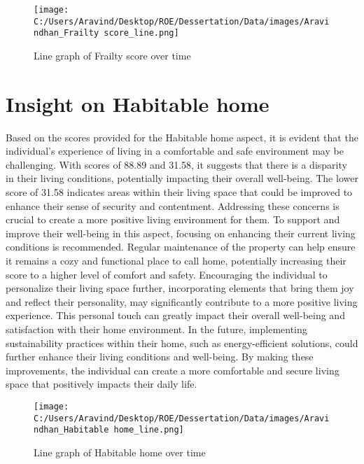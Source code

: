 \documentclass[10pt, a4paper]{article}%
\begin{document}
\begin{figure}[H]%
\centering%
\texttt{[image: C:/Users/Aravind/Desktop/ROE/Dessertation/Data/images/Aravindhan\_Frailty score\_line.png]}%
\caption{Line graph of Frailty score over time}%
\end{figure}

%
\section{Insight on Habitable home}%
\label{sec:InsightonHabitablehome}%
Based on the scores provided for the Habitable home aspect, it is evident that the individual's experience of living in a comfortable and safe environment may be challenging. With scores of 88.89 and 31.58, it suggests that there is a disparity in their living conditions, potentially impacting their overall well{-}being.\newline%
\newline%
The lower score of 31.58 indicates areas within their living space that could be improved to enhance their sense of security and contentment. Addressing these concerns is crucial to create a more positive living environment for them.\newline%
\newline%
To support and improve their well{-}being in this aspect, focusing on enhancing their current living conditions is recommended. Regular maintenance of the property can help ensure it remains a cozy and functional place to call home, potentially increasing their score to a higher level of comfort and safety.\newline%
\newline%
Encouraging the individual to personalize their living space further, incorporating elements that bring them joy and reflect their personality, may significantly contribute to a more positive living experience. This personal touch can greatly impact their overall well{-}being and satisfaction with their home environment.\newline%
\newline%
In the future, implementing sustainability practices within their home, such as energy{-}efficient solutions, could further enhance their living conditions and well{-}being. By making these improvements, the individual can create a more comfortable and secure living space that positively impacts their daily life.%


\begin{figure}[H]%
\centering%
\texttt{[image: C:/Users/Aravind/Desktop/ROE/Dessertation/Data/images/Aravindhan\_Habitable home\_line.png]}%
\caption{Line graph of Habitable home over time}%
\end{figure}
\end{document}
